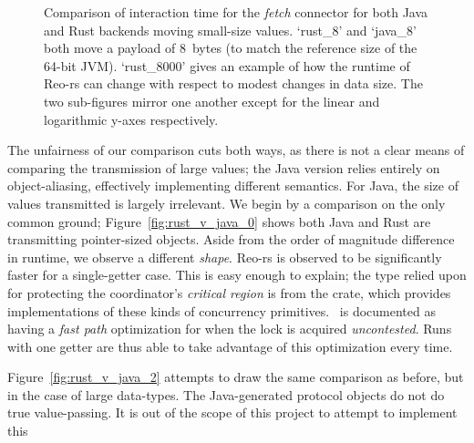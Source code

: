 \begin{figure}
{\begin{subfigure}[b]{0.63\textwidth}
			\caption{}
			\label{fig:rust_v_java_1}
		\end{subfigure}%
	}
	\caption[Java vs.\ Rust interaction time for small values.]{Comparison of interaction time for the \textit{fetch} connector for both Java and Rust backends moving small-size values. `rust\_8' and `java\_8' both move a payload of 8~bytes (to match the reference size of the 64-bit JVM). `rust\_8000' gives an example of how the runtime of Reo-rs can change with respect to modest changes in data size. The two sub-figures mirror one another except for the linear and logarithmic y-axes respectively.}
	\label{fig:rust_v_java}
\end{figure}

The unfairness of our comparison cuts both ways, as there is not a clear means of comparing the transmission of large values; the Java version relies entirely on object-aliasing, effectively implementing different semantics. For Java, the size of values transmitted is largely irrelevant. We begin by a comparison on the only common ground; Figure~\ref{fig:rust_v_java_0} shows both Java and Rust are transmitting pointer-sized objects. Aside from the order of magnitude difference in runtime, we observe a different \textit{shape}. Reo-rs is observed to be significantly faster for a single-getter case. This is easy enough to explain; the type relied upon for protecting the coordinator's \textit{critical region} is  from the  crate, which provides implementations of these kinds of concurrency primitives. ~is documented as having a \textit{fast path} optimization for when the lock is acquired \textit{uncontested}. Runs with one getter are thus able to take advantage of this optimization every time.

Figure~\ref{fig:rust_v_java_2} attempts to draw the same comparison as before, but in the case of large data-types. The Java-generated protocol objects do not do true value-passing. It is out of the scope of this project to attempt to implement this

